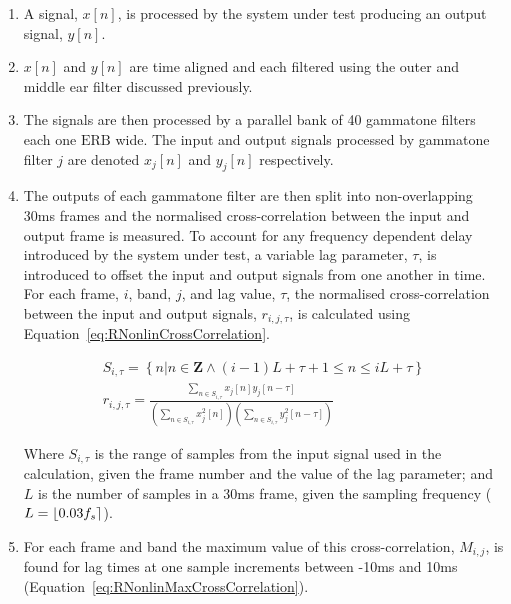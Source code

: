 			\begin{enumerate}
				\item A signal, $x[n]$, is processed by the system under test producing an output signal,
					$y[n]$.

				\item $x[n]$ and $y[n]$ are time aligned and each filtered using the outer and middle ear
					filter discussed previously.

				\item The signals are then processed by a parallel bank of 40 gammatone filters each one
					$\mathrm{ERB}$ wide. The input and output signals processed by gammatone filter $j$
					are denoted $x_j[n]$ and $y_j[n]$ respectively.

				\item The outputs of each gammatone filter are then split into non-overlapping 30ms frames
					and the normalised cross-correlation between the input and output frame is
					measured.  To account for any frequency dependent delay introduced by the system
					under test, a variable lag parameter, $\tau$, is introduced to offset the input and
					output signals from one another in time. For each frame, $i$, band, $j$, and lag
					value, $\tau$, the normalised cross-correlation between the input and output
					signals, $r_{i,j,\tau}$, is calculated using
					Equation~\ref{eq:RNonlinCrossCorrelation}.

					\begin{gather}
						S_{i,\tau} = \left\{ n | n \in \textbf{Z} 
							   \land (i-1)L+\tau+1 \leq n \leq iL + \tau \right\} \nonumber \\
						r_{i,j,\tau} = \frac{\sum_{n \in S_{i,\tau}} x_{j}[n]y_{j}[n-\tau]}
							{\left( \sum_{n \in S_{i,\tau}} x_{j}^{2}[n] \right) 
							\left( \sum_{n \in S_{i,\tau}} y_{j}^{2}[n-\tau] \right)}
						\label{eq:RNonlinCrossCorrelation}
					\end{gather}

					Where $S_{i,\tau}$ is the range of samples from the input signal used in the
					calculation, given the frame number and the value of the lag parameter; and $L$ is
					the number of samples in a 30ms frame, given the sampling frequency ($L =
					\left\lfloor0.03f_{s}\right\rceil$). 

				\item For each frame and band the maximum value of this cross-correlation, $M_{i,j}$, is
					found for lag times at one sample increments between -10ms and 10ms
					(Equation~\ref{eq:RNonlinMaxCrossCorrelation}).


\end{enumerate}
